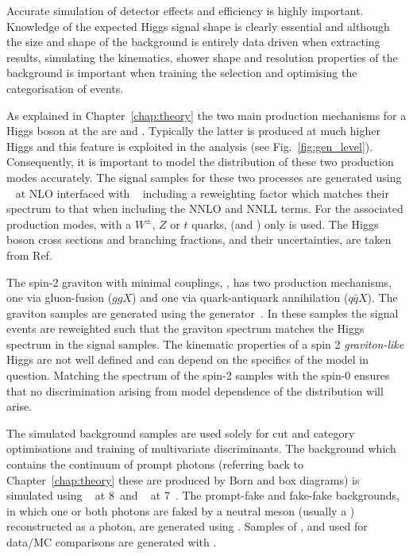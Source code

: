 Accurate simulation of detector effects and efficiency is highly important. Knowledge of the expected Higgs signal shape is clearly essential and although the size and shape of the \mgg background is entirely data driven when extracting results, simulating the kinematics, shower shape and resolution properties of the background is important when training the selection and optimising the categorisation of events. 

As explained in Chapter~\ref{chap:theory} the two main production mechanisms for a \SM Higgs boson at the \LHC are \ggH and \VBF. Typically the latter is produced at much higher Higgs \pT and this feature is exploited in the analysis (see Fig.~\ref{fig:gen_level}). Consequently, it is important to model the \pT distribution of these two production modes accurately. The signal samples for these two processes are generated using \POWHEG~\cite{powheg1,powheg2} at NLO interfaced with \PYTHIA~\cite{pythia} including a reweighting factor which matches their \pT spectrum to that when including the NNLO and NNLL terms. For the associated production modes, with a $W^{\pm}$, $Z$ or $t$ quarks, (\VH and \ttH) only \PYTHIA is used. The \SM Higgs boson cross sections and branching fractions, and their uncertainties, are taken from Ref.~\cite{LHCHiggsCrossSectionWorkingGroup3}

The spin-2 graviton with minimal couplings, \graviton, has two production mechanisms, one via gluon-fusion ($ggX$) and one via quark-antiquark annihilation ($q\bar{q}X$). The graviton samples are generated using the \JHU generator~\cite{jhu}. In these samples the signal events are reweighted such that the graviton \pT spectrum matches the Higgs \pT spectrum in the \SM signal samples. The kinematic properties of a spin 2 \textit{graviton-like} Higgs are not well defined and can depend on the specifics of the model in question. Matching the \pT spectrum of the spin-2 samples with the \SM spin-0 ensures that no discrimination arising from model dependence of the \pT distribution will arise. 

The simulated background samples are used solely for cut and category optimisations and training of multivariate discriminants. The background which contains the \QCD continuum of prompt photons (referring back to Chapter~\ref{chap:theory} these are produced by Born and box diagrams) is simulated using \SHERPA~\cite{sherpa} at 8~\TeV and \MADGRAPH~\cite{madgraph} at 7~\TeV. The prompt-fake and fake-fake backgrounds, in which one or both photons are faked by a neutral meson (usually a \pizero) reconstructed as a photon, are generated using \PYTHIA. Samples of \Zee, \Zmumu and \Zmumugamma used for data/MC comparisons are generated with \POWHEG.

